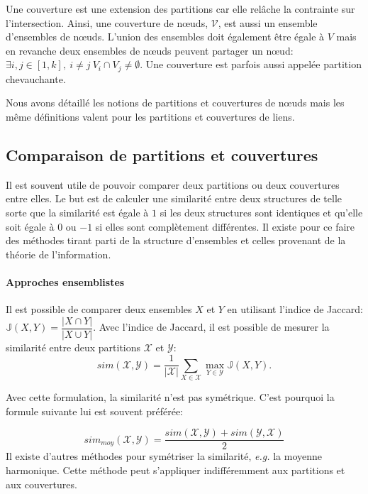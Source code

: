 Une couverture est une extension des partitions car elle relâche la contrainte sur l'intersection.
Ainsi, une couverture de n\oe uds, $\mathcal{V}$, est aussi un ensemble d'ensembles de n\oe uds.
L'union des ensembles doit également être égale à $V$ mais en revanche deux ensembles de n\oe uds peuvent partager un n\oe ud: $\exists i,j \in [1,k],\ i \neq j\ V_i \cap V_j \neq \emptyset$.
Une couverture est parfois aussi appelée partition chevauchante.

Nous avons détaillé les notions de partitions et couvertures de n\oe uds mais les même définitions valent pour les partitions et couvertures de liens.

\subsection{Comparaison de partitions et couvertures}
Il est souvent utile de pouvoir comparer deux partitions ou deux couvertures entre elles.
Le but est de calculer une similarité entre deux structures de telle sorte que la similarité est égale à $1$ si les deux structures sont identiques et qu'elle soit égale à $0$ ou $-1$ si elles sont complètement différentes.
Il existe pour ce faire des méthodes tirant parti de la structure d'ensembles et celles provenant de la théorie de l'information.

\paragraph{Approches ensemblistes}
\label{def:graphe_comparaison}
Il est possible de comparer deux ensembles $X$ et $Y$ en utilisant l'indice de Jaccard: $\mathbb{J}(X,Y) = \dfrac{|X \cap Y|}{|X \cup Y|}$.
Avec l'indice de Jaccard, il est possible de mesurer la similarité entre deux partitions $\mathcal{X}$ et $\mathcal{Y}$:
\begin{equation}
sim(\mathcal{X},\mathcal{Y})=\frac{1}{|\mathcal{X}|}\sum_{X \in \mathcal{X}}\max_{Y\in \mathcal{Y}}\mathbb{J}(X,Y).
\end{equation}

Avec cette formulation, la similarité n'est pas symétrique.
C'est pourquoi la formule suivante lui est souvent préférée:

\begin{equation}
sim_{moy}(\mathcal{X},\mathcal{Y}) = \dfrac{sim(\mathcal{X},\mathcal{Y})+sim(\mathcal{Y},\mathcal{X})}{2}
\end{equation}
Il existe d'autres méthodes pour symétriser la similarité, \emph{e.g.} la moyenne harmonique.
Cette méthode peut s'appliquer indifféremment aux partitions et aux couvertures.

